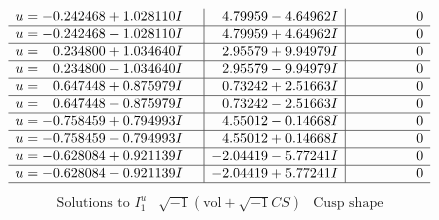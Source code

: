 \documentclass[1p]{elsarticle_modified}
\theoremstyle{definition}
\newcommand{\I}{\sqrt{-1}}
\begin{document}
$$\begin{array}{c|c|c}
\begin{aligned}
u &= -0.242468 + 1.028110 I\end{aligned}
 & \phantom{-}4.79959 - 4.64962 I & \phantom{-0.000000 } 0 \\ \hline\begin{aligned}
u &= -0.242468 - 1.028110 I\end{aligned}
 & \phantom{-}4.79959 + 4.64962 I & \phantom{-0.000000 } 0 \\ \hline\begin{aligned}
u &= \phantom{-}0.234800 + 1.034640 I\end{aligned}
 & \phantom{-}2.95579 + 9.94979 I & \phantom{-0.000000 } 0 \\ \hline\begin{aligned}
u &= \phantom{-}0.234800 - 1.034640 I\end{aligned}
 & \phantom{-}2.95579 - 9.94979 I & \phantom{-0.000000 } 0 \\ \hline\begin{aligned}
u &= \phantom{-}0.647448 + 0.875979 I\end{aligned}
 & \phantom{-}0.73242 + 2.51663 I & \phantom{-0.000000 } 0 \\ \hline\begin{aligned}
u &= \phantom{-}0.647448 - 0.875979 I\end{aligned}
 & \phantom{-}0.73242 - 2.51663 I & \phantom{-0.000000 } 0 \\ \hline\begin{aligned}
u &= -0.758459 + 0.794993 I\end{aligned}
 & \phantom{-}4.55012 - 0.14668 I & \phantom{-0.000000 } 0 \\ \hline\begin{aligned}
u &= -0.758459 - 0.794993 I\end{aligned}
 & \phantom{-}4.55012 + 0.14668 I & \phantom{-0.000000 } 0 \\ \hline\begin{aligned}
u &= -0.628084 + 0.921139 I\end{aligned}
 & -2.04419 - 5.77241 I & \phantom{-0.000000 } 0 \\ \hline\begin{aligned}
u &= -0.628084 - 0.921139 I\end{aligned}
 & -2.04419 + 5.77241 I & \phantom{-0.000000 } 0\\
 \hline 
 \end{array}$$\newpage$$\begin{array}{c|c|c}  
\text{Solutions to }I^u_{1}& \I (\text{vol} + \sqrt{-1}CS) & \text{Cusp shape}\\

\end{array}$$
\end{document}
